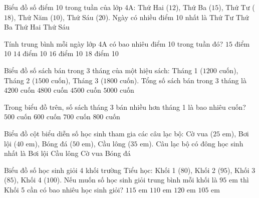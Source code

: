 \begin{ex} %
Biểu đồ số điểm 10 trong tuần của lớp 4A: Thứ Hai ($12$), Thứ Ba ($15$), Thứ Tư ($18$), Thứ Năm ($10$), Thứ Sáu ($20$). Ngày có nhiều điểm 10 nhất là
\choice
{Thứ Tư}
{Thứ Ba}
{Thứ Hai}
{\True Thứ Sáu}
\end{ex}

\begin{ex} %
Tính trung bình mỗi ngày lớp 4A có bao nhiêu điểm 10 trong tuần đó?
\choice
{\True $15$ điểm 10}
{$14$ điểm 10}
{$16$ điểm 10}
{$18$ điểm 10}
\end{ex}

\begin{ex} %
Biểu đồ số sách bán trong 3 tháng của một hiệu sách: Tháng 1 ($1200\text{ cuốn}$), Tháng 2 ($1500\text{ cuốn}$), Tháng 3 ($1800\text{ cuốn}$). Tổng số sách bán trong 3 tháng là
\choice
{$4200\text{ cuốn}$}
{$4800\text{ cuốn}$}
{\True $4500\text{ cuốn}$}
{$5000\text{ cuốn}$}
\end{ex}

\begin{ex} %
Trong biểu đồ trên, số sách tháng 3 bán nhiều hơn tháng 1 là bao nhiêu cuốn?
\choice
{$500$ cuốn}
{\True $600$ cuốn}
{$700$ cuốn}
{$800$ cuốn}
\end{ex}

\begin{ex} %
Biểu đồ cột biểu diễn số học sinh tham gia các câu lạc bộ: Cờ vua ($25\text{ em}$), Bơi lội ($40\text{ em}$), Bóng đá ($50\text{ em}$), Cầu lông ($35\text{ em}$). Câu lạc bộ có đông học sinh nhất là
\choice
{Bơi lội}
{Cầu lông}
{Cờ vua}
{\True Bóng đá}
\end{ex}

\begin{ex} %
Biểu đồ số học sinh giỏi 4 khối trường Tiểu học: Khối 1 ($80$), Khối 2 ($95$), Khối 3 ($85$), Khối 4 ($100$). Nếu muốn số học sinh giỏi trung bình mỗi khối là $95$ em thì Khối 5 cần có bao nhiêu học sinh giỏi?
\choice
{\True $115$ em}
{$110$ em}
{$120$ em}
{$105$ em}
\end{ex}

